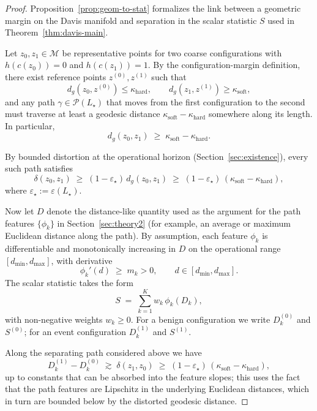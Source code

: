 \documentclass[11pt]{article}
\begin{document}
\begin{proof}
Proposition~\ref{prop:geom-to-stat} formalizes the link between a geometric margin on the Davis
manifold and separation in the scalar statistic $S$ used in Theorem~\ref{thm:davis-main}.

Let $z_0,z_1\in\mathcal{M}$ be representative points for two coarse configurations with
$h(c(z_0))=0$ and $h(c(z_1))=1$.  By the configuration-margin definition, there exist reference
points $z^{(0)}, z^{(1)}$ such that
\[
d_g(z_0,z^{(0)}) \le \kappa_{\mathrm{hard}},
\qquad
d_g(z_1,z^{(1)}) \ge \kappa_{\mathrm{soft}},
\]
and any path $\gamma\in\mathcal{P}(L_\star)$ that moves from the first configuration to the second
must traverse at least a geodesic distance $\kappa_{\mathrm{soft}}-\kappa_{\mathrm{hard}}$ somewhere along
its length.  In particular,
\[
d_g(z_0,z_1) \;\ge\; \kappa_{\mathrm{soft}}-\kappa_{\mathrm{hard}}.
\]

By bounded distortion at the operational horizon (Section~\ref{sec:existence}), every such path
satisfies
\[
\delta(z_0,z_1)
\;\ge\;
(1-\varepsilon_\star)\,d_g(z_0,z_1)
\;\ge\;
(1-\varepsilon_\star)\,(\kappa_{\mathrm{soft}}-\kappa_{\mathrm{hard}}),
\]
where $\varepsilon_\star := \varepsilon(L_\star)$.

Now let $D$ denote the distance-like quantity used as the argument for the path features
$\{\phi_k\}$ in Section~\ref{sec:theory2} (for example, an average or maximum Euclidean distance
along the path).  By assumption, each feature $\phi_k$ is differentiable and monotonically
increasing in $D$ on the operational range $[d_{\min},d_{\max}]$, with derivative
\[
\phi_k'(d) \;\ge\; m_k > 0,\qquad d\in[d_{\min},d_{\max}].
\]
The scalar statistic takes the form
\[
S \;=\; \sum_{k=1}^K w_k\,\phi_k(D_k),
\]
with non-negative weights $w_k\ge 0$.  For a benign configuration we write $D_k^{(0)}$ and $S^{(0)}$;
for an event configuration $D_k^{(1)}$ and $S^{(1)}$.

Along the separating path considered above we have
\[
D_k^{(1)} - D_k^{(0)}
\;\gtrsim\;
\delta(z_1,z_0)
\;\ge\;
(1-\varepsilon_\star)\,(\kappa_{\mathrm{soft}}-\kappa_{\mathrm{hard}}),
\]
up to constants that can be absorbed into the feature slopes; this uses the fact that the path
features are Lipschitz in the underlying Euclidean distances, which in turn are bounded below
by the distorted geodesic distance.


\end{proof}
\end{document}
